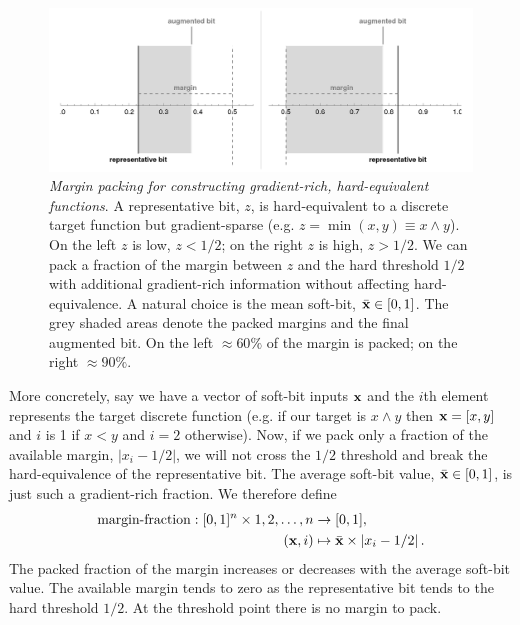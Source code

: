 \documentclass{article} %
\begin{document}
\begin{figure}[t]
	\centering
	\includegraphics[width=1.0\textwidth]{margin-trick.png}
	\caption{{\em Margin packing for constructing gradient-rich, hard-equivalent functions}. A representative bit, $z$, is hard-equivalent to a discrete target function but gradient-sparse (e.g. $z=\operatorname{min}(x,y) \equiv x \wedge y$). On the left $z$ is low, $z<1/2$; on the right $z$ is high, $z>1/2$. We can pack a fraction of the margin between $z$ and the hard threshold $1/2$ with additional gradient-rich information without affecting hard-equivalence. A natural choice is the mean soft-bit, $\bar{\bf x} \in [0,1]$. The grey shaded areas denote the packed margins and the final augmented bit. On the left $\approx 60\%$ of the margin is packed; on the right $\approx 90\%$.}
	\label{fig:margin-trick}
\end{figure}

More concretely, say we have a vector of soft-bit inputs ${\bf x}$ and the $i$th element represents the target discrete function (e.g. if our target is $x \wedge y$ then ${\bf x}=[x,y]$ and $i$ is 1 if $x<y$ and $i=2$ otherwise). Now, if we pack only a fraction of the available margin, $|x_{i}-1/2|$, we will not cross the $1/2$ threshold and break the hard-equivalence of the representative bit. The average soft-bit value, $\bar{\bf x} \in [0,1]$, is just such a gradient-rich fraction. We therefore define 
\begin{equation*}
\begin{aligned}
\operatorname{margin-fraction}: [0,1]^{n} \times 1,2,\dots,n &\to [0,1],\\
({\bf x}, i) &\mapsto \bar{\bf x} \times \left|x_{i} - 1/2\right| \text{.}
\end{aligned}
\end{equation*}
The packed fraction of the margin increases or decreases with the average soft-bit value. The available margin tends to zero as the representative bit tends to the hard threshold $1/2$. At the threshold point there is no margin to pack. 
\end{document}
